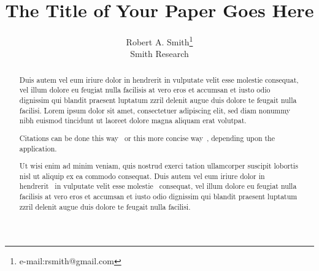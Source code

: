 \documentclass[review]{acmsiggraph}
\title{The Title of Your Paper Goes Here}
\author{Robert A. Smith\thanks{e-mail:rsmith@gmail.com}\\Smith Research}
\begin{document}



\maketitle


\begin{abstract}

Duis autem vel eum iriure dolor in hendrerit in vulputate velit esse
molestie consequat, vel illum dolore eu feugiat nulla facilisis at 
vero eros et accumsan et iusto odio dignissim qui blandit praesent
luptatum zzril delenit augue duis dolore te feugait nulla
facilisi. Lorem ipsum dolor sit amet, consectetuer adipiscing elit,
sed diam nonummy nibh euismod tincidunt ut laoreet dolore magna
aliquam erat volutpat.

Citations can be done this way~\cite{Jobs95} or this more concise 
way~, depending upon the application.

Ut wisi enim ad minim veniam, quis nostrud exerci tation ullamcorper
suscipit lobortis nisl ut aliquip ex ea commodo consequat. Duis autem
vel eum iriure dolor in hendrerit~\cite{Pellacini:2005:LAH}
in vulputate velit esse molestie~\cite{notes2002} 
consequat, vel illum dolore eu feugiat nulla facilisis at vero eros et
accumsan et iusto odio dignissim qui blandit praesent luptatum zzril
delenit augue duis dolore te feugait nulla facilisi.~\cite{Park:2006:DSI}

\end{abstract}
\end{document}
